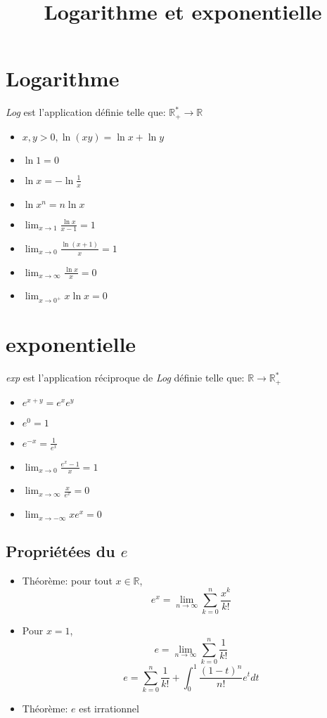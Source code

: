 \documentclass[fleqn]{article}
\title{Logarithme et exponentielle}
\date{}
\begin{document}
\maketitle

\section{Logarithme}
\emph{Log} est l'application d\'efinie telle que: $\mathbb{R}^*_+ \rightarrow \mathbb{R}$
\begin{itemize}
	\item $x,y>0, \ln (xy) = \ln x + \ln y$
	\item $\ln 1 = 0$
	\item $\ln x = -\ln \frac{1}{x}$
	\item $\ln x^n = n\ln x$
	\newline
	\item $\lim_{x\to 1} \frac{\ln x}{x-1} = 1$
	\item $\lim_{x\to 0} \frac{\ln (x+1)}{x} = 1$
	\item $\lim_{x\to\infty} \frac{\ln x}{x} = 0$
	\item $\lim_{x\to 0^+} x\ln x = 0$
\end{itemize}

\section{exponentielle}
\emph{exp} est l'application r\'eciproque de \emph{Log} d\'efinie telle que: $\mathbb{R} \rightarrow \mathbb{R}^*_+$
\begin{itemize}
	\item $e^{x+y} = e^xe^y$
	\item $e^0 = 1$
	\item $e^{-x} = \frac{1}{e^x}$
	\newline
	\item $\lim_{x\to 0} \frac{e^x-1}{x} = 1$
	\item $\lim_{x\to\infty} \frac{x}{e^x} = 0$
	\item $\lim_{x\to-\infty} xe^x = 0$
\end{itemize}

\subsection{Propri\'et\'ees du $e$}
\begin{itemize}
	\item Th\'eor\`eme: pour tout $x \in \mathbb{R}$,
		\[e^x = \lim_{n\to\infty} \sum_{k=0}^{n} \frac{x^k}{k!} \]
	\item Pour $x = 1$,
		\[e = \lim_{n\to\infty} \sum_{k=0}^{n} \frac{1}{k!}\]
		\[e = \sum_{k=0}^{n} \frac{1}{k!} + \int_{0}^{1} \frac{(1-t)^n}{n!}e^tdt\]
	\item Th\'eor\`eme: $e$ est irrationnel
\end{itemize}
\end{document}
